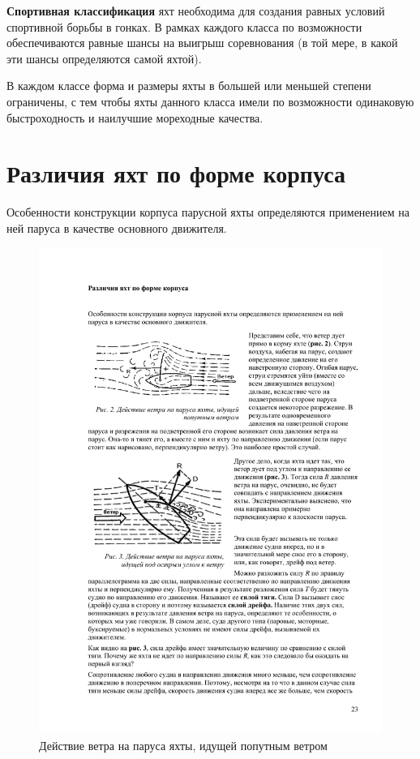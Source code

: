 \documentclass[a4paper, 12pt, twoside, final]{scrbook}
\begin{document}
\textbf{Спортивная классификация}
яхт необходима для создания равных условий спортивной борьбы в гонках.
В рамках каждого класса по возможности обеспечиваются равные шансы
на выигрыш соревнования (в той мере, в какой эти шансы определяются
самой яхтой).

В каждом классе форма и размеры яхты в большей или меньшей степени
ограничены, с тем чтобы яхты данного класса имели по возможности одинаковую
быстроходность и наилучшие мореходные качества.

%
%

\section{Различия яхт по форме корпуса}

Особенности конструкции корпуса парусной яхты определяются применением
на ней паруса в качестве основного движителя.

\begin{figure}%
\centering\includegraphics[scale=1]{Deystvie_poputnogo_vetra}
\protect\caption{\label{fig:Deystvie_poputnogo_vetra}Действие
ветра на паруса яхты, идущей попутным ветром}
\end{figure}%
\end{document}
